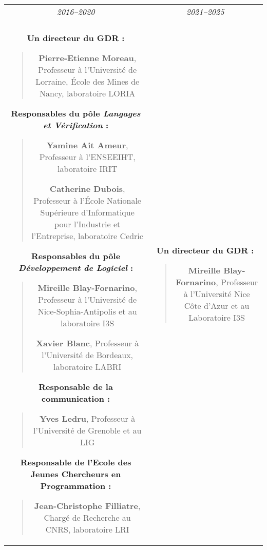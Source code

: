 \documentclass[11pt]{article}
\begin{document}
\begin{small}
\begin{center}
\begin{tabular}{c|c}
  \textit{2016--2020} & \textit{2021--2025}\\
  \\

\hspace*{0.2cm}
\begin{minipage}[t]{.5\textwidth}
  \textbf{Un directeur du GDR :}
  \begin{quote}
    \textbf{Pierre-Etienne Moreau},
  Professeur à l'Université de Lorraine, École des
        Mines de Nancy, laboratoire LORIA
  \end{quote}
  \textbf{Responsables du pôle \textit{Langages et Vérification} :}
  \begin{quote}
    \textbf{Yamine Ait Ameur}, Professeur à l'ENSEEIHT, laboratoire IRIT

    \textbf{Catherine Dubois}, Professeur à l'École Nationale Supérieure d'Informatique pour l'Industrie et l'Entreprise, laboratoire Cedric
  \end{quote}

  \textbf{Responsables du pôle \textit{Développement de Logiciel} :}
  \begin{quote}
    \textbf{Mireille Blay-Fornarino}, Professeur à l'Université de Nice-Sophia-Antipolis et au laboratoire I3S

    \textbf{Xavier Blanc}, Professeur à l'Université de Bordeaux, laboratoire LABRI
\end{quote}

\textbf{Responsable de la communication :}
\begin{quote}
  \textbf{Yves Ledru}, Professeur à l'Université de Grenoble et au LIG
\end{quote}

\textbf{Responsable de l'Ecole des Jeunes Chercheurs en Programmation :}
\begin{quote}
  \textbf{Jean-Christophe Filliatre}, Chargé de Recherche au CNRS, laboratoire LRI
\end{quote}
\end{minipage}
&
\begin{minipage}[t]{.5\textwidth}
\textbf{Un directeur du GDR :}
  \begin{quote}
    \textbf{Mireille Blay-Fornarino}, Professeur à l'Université Nice Côte d'Azur et au Laboratoire I3S
  \end{quote}


\end{minipage}
\end{tabular}
\end{center}
\end{small}
\end{document}
